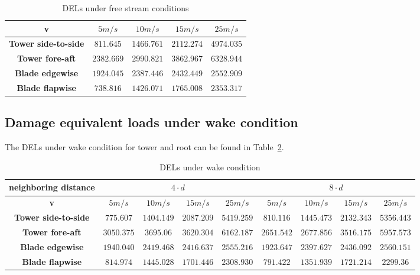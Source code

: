 \documentclass[10pt]{article}
\begin{document}
\begin{table}[H]
\centering
\begin{tabular}{| c | c | c | c | c |}
\hline
\textbf{v} & $5m/s$ & $10m/s$ & $15m/s$ & $25m/s$ \\
\hline
\textbf{Tower side-to-side} & $811.645$ & $1466.761$ & $2112.274$ & $4974.035$ \\
\hline
\textbf{Tower fore-aft} & $2382.669$ & $2990.821$ & $3862.967$ & $6328.944$	\\
\hline
\textbf{Blade edgewise} & $1924.045$ & $2387.446$ & $2432.449$ & $2552.909$	\\
\hline
\textbf{Blade flapwise} & $738.816$ & $1426.071$ & $1765.008$ & $2353.317$	\\
\hline
\end{tabular}
\caption{DELs under free stream conditions}
\label{tab:DELfree}
\end{table}


\subsection{Damage equivalent loads under wake condition}
The DELs under wake condition for tower and root can be found in Table~\ref{tab:DELwake}.

\begin{table}[H]
\begin{tabular}{| c | c | c | c | c |c | c | c | c |}
\hline
\multicolumn{1}{|c|}{\textbf{neighboring distance}} & \multicolumn{4}{c|}{$4\cdot d$} & \multicolumn{4}{c|}{$8\cdot d$} \\ 
\hline
\textbf{v} & $5m/s$ & $10m/s$ & $15m/s$ & $25m/s$ & $5m/s$ & $10m/s$ & $15m/s$ & $25m/s$ \\
\hline
\textbf{Tower side-to-side} & $775.607$ & $1404.149$ & $2087.209$ & $5419.259$ & $810.116$ & $1445.473$ & $2132.343$ & $5356.443$ \\
\hline
\textbf{Tower fore-aft} & $3050.375$ & $3695.06$ & $3620.304$ & $6162.187$ & $2651.542$ & $2677.856$ & $3516.175$ & $5957.573$	\\
\hline
\textbf{Blade edgewise} & $1940.040$ & $2419.468$ & $2416.637$ & $2555.216$ & $1923.647$ & $2397.627$ & $2436.092$ & $2560.151$	\\
\hline
\textbf{Blade flapwise} & $814.974$ & $1445.028$ & $1701.446$ & $2308.930$ & $791.422$ & $1351.939$ & $1721.214$ & $2299.36$	\\
\hline
\end{tabular}
\caption{DELs under wake condition}
\label{tab:DELwake}
\end{table}
\end{document}
